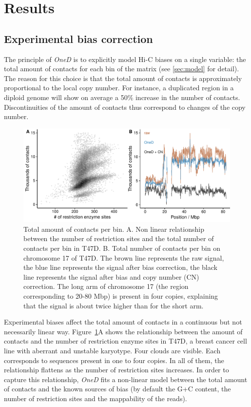 \documentclass{bioinfo}
\begin{document}

\section{Results}

\subsection{Experimental bias correction}

The principle of \textit{OneD} is to explicitly model Hi-C biases on a
single variable: the total amount of contacts for each bin of the matrix
(see \ref{sec:model} for detail). The reason for this choice is that the
total amount of contacts is approximately proportional to the local copy
number. For instance, a duplicated region in a diploid genome will show on
average a 50\% increase in the number of contacts. Discontinuities of the
amount of contacts thus correspond to changes of the copy number.

\begin{figure}
\centerline{\includegraphics[width=.45\textwidth]{img/figure1.pdf}}
\caption{Total amount of contacts per bin. A. Non linear relationship
between the number of restriction sites and the total number of
contacts per bin in T47D. B. Total number of contacts per bin on
chromosome 17 of T47D. The brown line represents the raw
signal, the blue line represents the signal after bias correction, the
black line represents the signal after bias and copy number (CN) correction.
The long arm of chromosome 17 (the region corresponding to 20-80 Mbp) is
present in four copies, explaining that the signal is about twice higher
than for the short arm.}
\label{fig:totals}
\end{figure}


Experimental biases affect the total amount of contacts in a continuous
but not necessarily linear way. Figure~\ref{fig:totals}A shows the
relationship between the amount of contacts and the number of restriction
enzyme sites in T47D, a breast cancer cell line with aberrant and unstable
karyotype.  Four clouds are visible. Each corresponds to sequences present
in one to four copies. In all of them, the relationship flattens as the
number of restriction sites increases. In order to capture this
relationship, \textit{OneD} fits a non-linear model between the total
amount of contacts and the known sources of bias (by default the G+C
content, the number of restriction sites and the mappability of the
reads).
\end{document}
